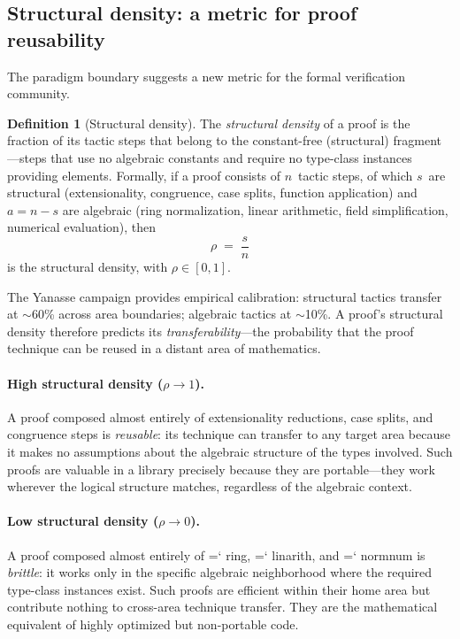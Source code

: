 \documentclass[11pt]{article}
\renewcommand{\texttt}[1]{%
  \begingroup\ttfamily\hyphenchar\font=`\-\relax
  \def\_{\textunderscore\discretionary{}{}{}}%
  #1\endgroup}
\theoremstyle{definition}
\newtheorem{definition}[theorem]{Definition}
\theoremstyle{remark}
\begin{document}
\subsection{Structural density: a metric for proof reusability}

The paradigm boundary suggests a new metric for the formal
verification community.

\begin{definition}[Structural density]%
\label{def:structural_density}
The \emph{structural density} of a proof is the fraction of its
tactic steps that belong to the constant-free (structural)
fragment---steps that use no algebraic constants and require no
type-class instances providing elements.  Formally, if a proof
consists of $n$~tactic steps, of which $s$~are structural
(extensionality, congruence, case splits, function application)
and $a = n - s$ are algebraic (ring normalization, linear
arithmetic, field simplification, numerical evaluation), then
\[
  \rho \;=\; \frac{s}{n}
\]
is the structural density, with $\rho \in [0, 1]$.
\end{definition}

\noindent The Yanasse campaign provides empirical calibration:
structural tactics transfer at ${\sim}$60\% across area boundaries;
algebraic tactics at ${\sim}$10\%.  A proof's structural density
therefore predicts its \emph{transferability}---the probability
that the proof technique can be reused in a distant area of
mathematics.

\paragraph{High structural density ($\rho \to 1$).}
A proof composed almost entirely of extensionality reductions,
case splits, and congruence steps is \emph{reusable}: its technique
can transfer to any target area because it makes no assumptions
about the algebraic structure of the types involved.  Such proofs
are valuable in a library precisely because they are
portable---they work wherever the logical structure matches,
regardless of the algebraic context.

\paragraph{Low structural density ($\rho \to 0$).}
A proof composed almost entirely of \texttt{ring}, \texttt{linarith},
and \texttt{norm\_num} is \emph{brittle}: it works only in the
specific algebraic neighborhood where the required type-class
instances exist.  Such proofs are efficient within their home area
but contribute nothing to cross-area technique transfer.  They are
the mathematical equivalent of highly optimized but non-portable
code.
\end{document}
